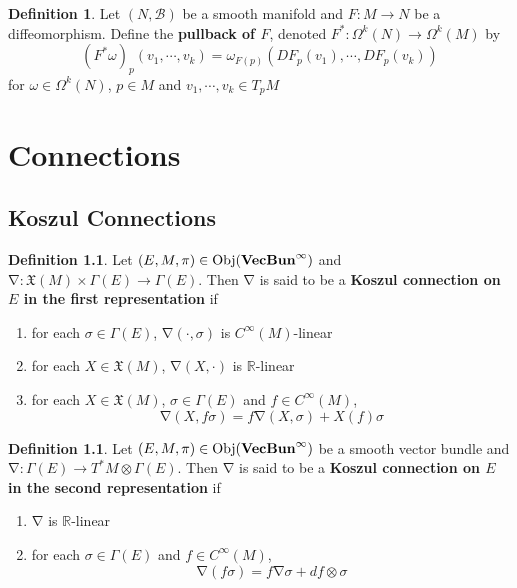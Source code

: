\documentclass{book}
\theoremstyle{definition}
\newtheorem{defn}[definition]{Definition}
\newcommand{\sig}{\sigma}
\newcommand{\om}{\omega}
\newcommand{\Gam}{\Gamma}
\newcommand{\Om}{\Omega}
\newcommand{\R}{\mathbb{R}}
\newcommand{\MB}{\mathcal{B}}
\newcommand{\MFX}{\mathfrak{X}}
\DeclareMathOperator{\Obj}{Obj}
\DeclareMathOperator{\nab}{\nabla}
\DeclareMathOperator*{\VecBuninf}{\text{\tbf{VecBun}}^{\infty}}
\DeclareMathOperator*{\0}{\mbf{0}}
\DeclareMathOperator*{\1}{\mbf{1}}
\newcommand{\tbf}[1]{\textbf{#1}}
\begin{document}
	
	\begin{defn}
		Let $(N, \MB)$ be a smooth manifold and $F: M \rightarrow N$ be a diffeomorphism. Define the \tbf{pullback of $F$}, denoted $F^*: \Om^k(N) \rightarrow \Om^k(M)$ by  $$(F^* \om)_p (v_1, \cdots, v_k) = \om_{F(p)} (DF_p(v_1), \cdots, DF_p(v_k))$$ for $\om \in \Om^k(N)$, $p \in M$ and $v_1, \cdots, v_k \in T_{p}M$
	\end{defn}





	


























	
	\newpage
	\chapter{Connections}
	
	\section{Koszul Connections}
	
	\begin{defn}
		Let $(E, M, \pi) \in \Obj(\VecBuninf)$ and $\nab : \MFX(M) \times \Gam(E) \rightarrow \Gam(E)$. Then $\nab$ is said to be a \tbf{Koszul connection on $E$ in the first representation} if 
		\begin{enumerate}
			\item for each $\sig \in \Gam(E)$, $\nab(\cdot, \sig)$ is $C^{\infty}(M)$-linear
			\item for each $X \in \MFX(M)$, $\nab(X, \cdot)$ is $\R$-linear
			\item for each $X \in \MFX(M)$, $\sig \in \Gam(E)$ and $f \in C^{\infty}(M)$, 
			$$\nab(X, f\sig) = f \nab(X, \sig) + X(f) \sig$$ 
		\end{enumerate}
	\end{defn}

	\begin{defn}
		Let $(E, M, \pi) \in \Obj(\VecBuninf)$ be a smooth vector bundle and $\nab : \Gam(E) \rightarrow T^*M \otimes \Gam(E)$. Then $\nab$ is said to be a \tbf{Koszul connection on $E$ in the second representation} if 
		\begin{enumerate}
			\item $\nab$ is $\R$-linear
			\item for each $\sig \in \Gam(E)$ and $f \in C^{\infty}(M)$, 
			$$\nab(f\sig) = f \nab \sig + df \otimes \sig $$ 
		\end{enumerate}
	\end{defn}
\end{document}
